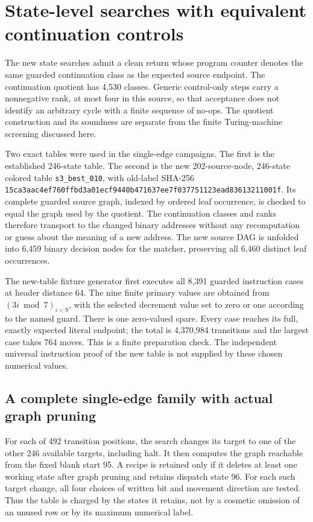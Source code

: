 \section{State-level searches with equivalent continuation controls}
\label{sec:state-quotient-search}

The new state searches admit a clean return whose program counter denotes
the same guarded continuation class as the expected source endpoint.
The continuation quotient has 4,530 classes. Generic control-only steps
carry a nonnegative rank, at most four in this source, so that acceptance
does not identify an arbitrary cycle with a finite sequence of no-ops.
The quotient construction and its soundness are separate from the finite
Turing-machine screening discussed here.

Two exact tables were used in the single-edge campaigns. The first is the established 246-state table.
The second is the new 202-source-node, 246-state colored table
\texttt{s3\_best\_010}, with old-label SHA-256
\nolinkurl{15ca3aac4ef760ffbd3a01ecf9440b471637ee7f037751123ead83613211001f}.
Its complete guarded source graph, indexed by ordered leaf occurrence,
is checked to equal the graph used by the quotient. The continuation
classes and ranks therefore transport to the changed binary addresses
without any recomputation or guess about the meaning of a new address.
The new source DAG is unfolded into 6,459 binary decision nodes for the
matcher, preserving all 6,460 distinct leaf occurrences.

The new-table fixture generator first executes all 8,391 guarded
instruction cases at header distance 64. The nine finite primary values
are obtained from $(3i\bmod7)_{i<9}$, with the selected decrement value
set to zero or one according to the named guard. There is one zero-valued
spare. Every case reaches its full, exactly expected literal endpoint;
the total is 4,370,984 transitions and the largest case takes 764 moves.
This is a finite preparation check. The independent universal instruction
proof of the new table is not supplied by these chosen numerical values.

\subsection{A complete single-edge family with actual graph pruning}

For each of 492 transition positions, the search changes its target to
one of the other 246 available targets, including halt. It then computes
the graph reachable from the fixed blank start 95. A recipe is retained
only if it deletes at least one working state after graph pruning and
retains dispatch state 96. For each such target change, all four choices
of written bit and movement direction are tested. Thus the table is
charged by the states it retains, not by a cosmetic omission of an
unused row or by its maximum numerical label.

